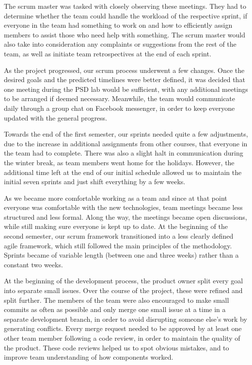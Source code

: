 \documentclass{l3proj}
\begin{document}
 The scrum master was tasked with closely observing these meetings. They had
  to determine whether the team could handle the workload of the respective
  sprint, if everyone in the team had something to work on and how to efficiently
  assign members to assist those who need help with something. The scrum
  master would also take into consideration any complaints or suggestions from
  the rest of the team, as well as initiate team retrospectives at the end of
  each sprint.

 As the project progressed, our scrum process underwent a few changes. Once
 the desired goals and the predicted timelines were better defined, it was
 decided that one meeting during the PSD lab would be sufficient, with any
 additional meetings to be arranged if deemed necessary. Meanwhile, the team
 would communicate daily through a group chat on Facebook messenger, in order
 to keep everyone updated with the general progress.

Towards the end of the first semester, our sprints needed quite a few
 adjustments, due to the increase in additional assignments from other
 courses, that everyone in the team had to complete. There was also a
 slight halt in communication during the winter break, as team members
 went home for the holidays. However, the additional time left at the
 end of our initial schedule allowed us to maintain the initial seven
 sprints and just shift everything by a few weeks.

As we became more comfortable working as a team and since at that
 point everyone was comfortable with the new technologies, team
 meetings became less structured and less formal. Along the way,
 the meetings became open discussions, while still making sure
 everyone is kept up to date. At the beginning of the second
 semester, our scrum framework transitioned into a less clearly
 defined agile framework, which still followed the main principles
 of the methodology. Sprints became of variable length (between
 one and three weeks) rather than a constant two weeks.

 

At the beginning of the development process, the product owner split
 every goal into separate small issues. Over the course of the project,
 these were refined and split further. The members of the team were
 also encouraged to make small commits as often as possible and only
 merge one small issue at a time in a separate development branch, in order
 to avoid disrupting someone else's work by generating conflicts.
 Every merge request needed to be approved by at least one other
 team member following a code review, in order to maintain the quality
 of the product. These code reviews helped us to spot obvious mistakes,
 and to improve team understanding of how components worked.
\end{document}
